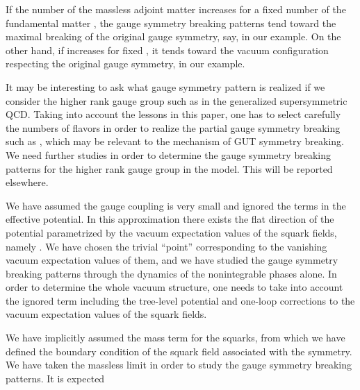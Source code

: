 \documentclass[a4paper,12pt]{article}
\begin{document}
{If the number of the massless 
adjoint matter \coordHE{} increases for a 
fixed number of the fundamental matter \coordHE{}, the gauge symmetry 
breaking patterns tend toward the maximal breaking 
of the original gauge symmetry, say, \coordHE{} in our example.
On the other hand, if \coordHE{} increases for fixed 
\coordHE{}, it tends toward the vacuum configuration respecting the
original gauge symmetry, \coordHE{} in our example. 
\par
It may be interesting to ask what gauge symmetry pattern is realized if we 
consider the higher rank gauge group such as \coordHE{} in the 
generalized supersymmetric QCD. 
Taking into account the lessons in this paper, one has to 
select carefully the numbers of 
flavors \coordHE{} in order to realize
the partial gauge symmetry breaking such 
as \coordHE{}, which 
may be relevant to
the mechanism of GUT symmetry breaking. We need further 
studies in order to determine the gauge symmetry breaking patterns 
for the higher rank gauge group in the model. 
This will be reported elsewhere.
\par
We have assumed the gauge coupling \coordHE{} is very small and ignored 
the \coordHE{} terms in the effective potential.
In this approximation there exists the flat direction
of the potential parametrized by the vacuum expectation values of 
the squark fields, namely \coordHE{}. 
We have chosen the trivial ``point'' corresponding to
the vanishing vacuum expectation values of them, and we 
have studied the gauge
symmetry breaking patterns through the dynamics of the nonintegrable
phases alone. In order to determine the whole vacuum
structure, one needs to take into account the 
ignored \coordHE{} term including the tree-level potential and 
one-loop corrections to the vacuum expectation values of the squark fields. 
\par
We have implicitly assumed the mass term for the squarks, from which we have 
defined the boundary condition of the squark field
associated with the \coordHE{} symmetry. We have taken the massless limit 
in order to study the gauge symmetry breaking patterns. It is expected 
}
\end{document}
